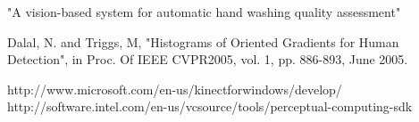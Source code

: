 \documentclass[a4paper,11pt,oneside]{book}
\begin{document}
\begin{thebibliography}{2}
 "A vision-based system for automatic hand washing quality assessment"

 Dalal, N. and Triggs, M, "Histograms of Oriented Gradients for Human Detection", in Proc. Of IEEE CVPR2005, vol. 1, pp. 886-893, June 2005.

 http://www.microsoft.com/en-us/kinectforwindows/develop/
 http://software.intel.com/en-us/vcsource/tools/perceptual-computing-sdk

\end{thebibliography}
\end{document}
